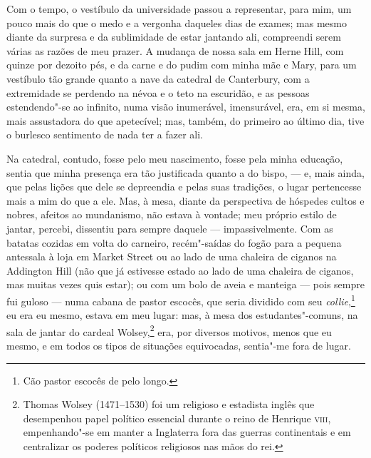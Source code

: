Com o tempo, o vestíbulo da universidade passou a representar, para
mim, um pouco mais do que o medo e a vergonha daqueles dias de exames;
mas mesmo diante da surpresa e da sublimidade de estar jantando ali,
compreendi serem várias as razões de meu prazer. A mudança de nossa sala
em Herne Hill, com quinze por dezoito pés, e da carne e do pudim com
minha mãe e Mary, para um vestíbulo tão grande quanto a nave da catedral
de Canterbury, com a extremidade se perdendo na névoa e o teto na
escuridão, e as pessoas estendendo"-se ao infinito, numa visão
inumerável, imensurável, era, em si mesma, mais assustadora do que
apetecível; mas, também, do primeiro ao último dia, tive o burlesco
sentimento de nada ter a fazer ali.

Na catedral, contudo, fosse pelo meu nascimento, fosse pela minha
educação, sentia que minha presença era tão justificada quanto a do
bispo, --- e, mais ainda, que pelas lições que dele se depreendia e pelas
suas tradições, o lugar pertencesse mais a mim do que a ele. Mas, à
mesa, diante da perspectiva de hóspedes cultos e nobres, afeitos ao
mundanismo, não estava à vontade; meu próprio estilo de jantar, percebi,
dissentiu para sempre daquele --- impassivelmente. Com as batatas cozidas
em volta do carneiro, recém"-saídas do fogão para a pequena antessala à
loja em Market Street ou ao lado de uma chaleira de ciganos na Addington
Hill (não que já estivesse estado ao lado de uma chaleira de ciganos,
mas muitas vezes quis estar); ou com um bolo de aveia e manteiga --- pois
sempre fui guloso --- numa cabana de pastor escocês, que seria dividido
com seu \textit{collie},\footnote{Cão pastor escocês de pelo longo.} eu era eu mesmo, estava em meu lugar: mas, à mesa dos
estudantes"-comuns, na sala de jantar do cardeal Wolsey,\footnote{Thomas
  Wolsey (1471--1530) foi um religioso e estadista inglês que desempenhou papel
  político essencial durante o reino de Henrique \textsc{viii}, empenhando"-se em
  manter a Inglaterra fora das guerras continentais e em centralizar os
  poderes políticos religiosos nas mãos do rei.} era,
por diversos motivos, menos que eu mesmo, e em todos os tipos de
situações equivocadas, sentia"-me fora de lugar.

